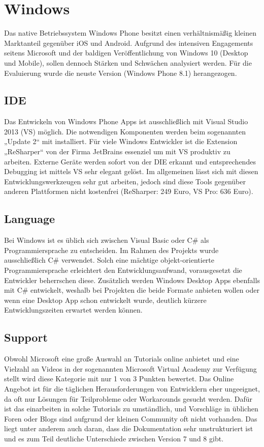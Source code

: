 \section{Windows}

Das native Betriebssystem Windows Phone besitzt einen verhältnismäßig kleinen Marktanteil gegenüber iOS und Android. Aufgrund des intensiven Engagements seitens Microsoft und der baldigen Veröffentlichung von Windows 10 (Desktop und Mobile), sollen dennoch Stärken und Schwächen analysiert werden. Für die Evaluierung wurde die neuste Version (Windows Phone 8.1) herangezogen.

\subsection{IDE}

Das Entwickeln von Windows Phone Apps ist ausschließlich mit Visual Studio 2013 (VS) möglich. Die notwendigen Komponenten werden beim sogenannten „Update 2“ mit installiert. Für viele Windows Entwickler ist die Extension „ReSharper“ von der Firma JetBrains essenziel um mit VS produktiv zu arbeiten. Externe Geräte werden sofort von der DIE erkannt und entsprechendes Debugging ist mittels VS sehr elegant gelöst. Im allgemeinen lässt sich mit diesen Entwicklungswerkzeugen sehr gut arbeiten, jedoch sind diese Tools gegenüber anderen Plattformen nicht kostenfrei (ReSharper: 249 Euro, VS Pro: 636 Euro).

\subsection{Language}

Bei Windows ist es üblich sich zwischen Visual Basic oder C\# als Programmiersprache zu entscheiden. Im Rahmen des Projekts wurde ausschließlich C\# verwendet. Solch eine mächtige objekt-orientierte Programmiersprache erleichtert den Entwicklungsaufwand, vorausgesetzt die Entwickler beherrschen diese. Zusätzlich werden Windows Desktop Apps ebenfalls mit C\# entwickelt, weshalb bei Projekten die beide Formate anbieten wollen oder wenn eine Desktop App schon entwickelt wurde, deutlich kürzere Entwicklungszeiten erwartet werden können.

\subsection{Support}

Obwohl Microsoft eine große Auswahl an Tutorials online anbietet und eine Vielzahl an Videos in der sogenannten Microsoft Virtual Academy zur Verfügung stellt wird diese Kategorie mit nur 1 von 3 Punkten bewertet.  Das Online Angebot ist für die täglichen Herausforderungen von Entwicklern eher ungeeignet, da oft nur Lösungen für Teilprobleme oder Workarounds gesucht werden. Dafür ist das einarbeiten in solche Tutorials zu umständlich, und Vorschläge in üblichen Foren oder Blogs sind aufgrund der kleinen Community oft nicht vorhanden. Das liegt unter anderem auch daran, dass die Dokumentation sehr unstrukturiert ist und es zum Teil deutliche Unterschiede zwischen Version 7 und 8 gibt.

